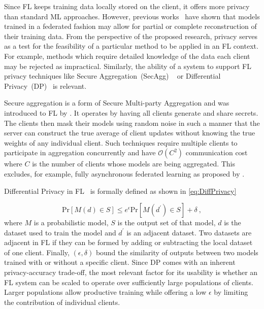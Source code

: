 Since FL keeps training data locally stored on the client, it offers more privacy than standard ML approaches. However, previous works~\citep{InvertingGradients,ProtectionAgainstReconstructionAndItsApplicationsInPrivateFL,PrivacyPreservingDLAdditivelyHomo,DeepLeakage} have shown that models trained in a federated fashion may allow for partial or complete reconstruction of their training data. From the perspective of the proposed research, privacy serves as a test for the feasibility of a particular method to be applied in an FL context. For example, methods which require detailed knowledge of the data each client~\citep{FLwithNonIID, OptimalUserEdgeAssingmentHierFL,FedHOME,CommEffDistillation} may be rejected as impractical. Similarly, the ability of a system to support FL privacy techniques like Secure Aggregation~(SecAgg) ~\citep{SecAggOG,FastSecAgg,LightSecAgg} or Differential Privacy~(DP)~\citep{DiffPrivacyOriginal,DiffPrivacyFL,LearningDifferentiallyPrivateRNNs,TowardsFairPrivacyPreservingFL,PracticalPrivateFLkairouz21b} is relevant.


Secure aggregation is a form of Secure Multi-party Aggregation and was introduced to FL by \citet{SecAggOG}. It operates by having all clients generate and share secrets. The clients then mask their models using random noise in such a manner that the server can construct the true average of client updates without knowing the true weights of any individual client. Such techniques require multiple clients to participate in aggregation concurrently and have $\mathcal{O}(C^2)$ communication cost where $C$ is the number of clients whose models are being aggregated. This excludes, for example, fully asynchronous federated learning as proposed by \citet{AsyncFedOpt}.

Differential Privacy in FL~\citep{LearningDifferentiallyPrivateRNNs} is formally defined as shown in \cref{eq:DiffPrivacy}

\begin{equation}\label{eq:DiffPrivacy}
    \mathrm{Pr}[M(d) \in S] \leq e^\epsilon \mathrm{Pr}[M(d^\prime) \in S] + \delta \ ,
\end{equation}
where $M$ is a probabilistic model, $S$ is the output set of that model, $d$ is the dataset used to train the model and $d^\prime$ is an adjacent dataset. Two datasets are adjacent in FL if they can be formed by adding or subtracting the local dataset of one client.  Finally, $(\epsilon,\delta)$ bound the similarity of outputs between two models trained with or without a specific client. Since DP comes with an inherent privacy-accuracy trade-off, the most relevant factor for its usability is whether an FL system can be scaled to operate over sufficiently large populations of clients. Larger populations allow productive training while offering a low $\epsilon$ by limiting the contribution of individual clients.

